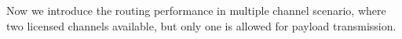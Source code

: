 


Now we introduce the routing performance in multiple channel scenario, where two licensed channels available, but only one is allowed for payload transmission.


